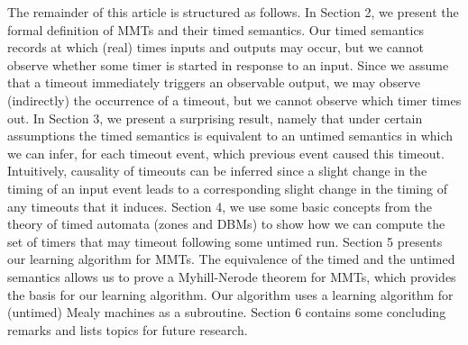 The remainder of this article is structured as follows.
In Section 2, we present the formal definition of MMTs and their timed semantics.
Our timed semantics records at which (real) times inputs and outputs may occur, but we cannot observe whether some timer is started
in response to an input. Since we assume that a timeout immediately triggers an observable output, we may observe
(indirectly) the occurrence of a timeout, but we cannot observe which timer times out.
In Section 3, we present a surprising result, namely that under certain assumptions the timed semantics is equivalent to an untimed
semantics in which we can infer, for each timeout event, which previous event caused this timeout.
Intuitively, causality of timeouts can be inferred since a slight change in the timing of an input event leads to a corresponding slight change in
the timing of any timeouts that it induces.
Section 4, we use some basic concepts from the theory of timed automata (zones and DBMs) to show how we can compute the set of timers that may
timeout following some untimed run.
Section 5 presents our learning algorithm for MMTs. The equivalence of the timed and the untimed semantics allows us to prove
a Myhill-Nerode theorem for MMTs, which provides the basis for our learning algorithm. Our algorithm uses a learning algorithm for
(untimed) Mealy machines as a subroutine.
Section 6 contains some concluding remarks and lists topics for future research.

